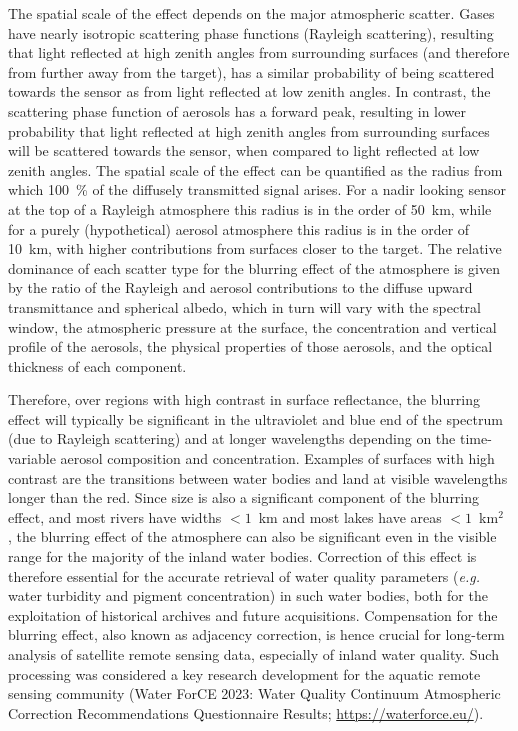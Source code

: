The spatial scale of the effect depends on the major atmospheric scatter. Gases have nearly isotropic scattering phase functions (Rayleigh scattering), resulting that light reflected at high zenith angles from surrounding surfaces (and therefore from further away from the target), has a similar probability of being scattered towards the sensor as from light reflected at low zenith angles. In contrast, the scattering phase function of aerosols has a forward peak, resulting in lower probability that light reflected at high zenith angles from surrounding surfaces will be scattered towards the sensor, when compared to light reflected at low zenith angles. The spatial scale of the effect can be quantified as the radius from which 100~\% of the diffusely transmitted signal arises. For a nadir looking sensor at the top of a Rayleigh atmosphere this radius is in the order of 50~km, while for a purely (hypothetical) aerosol atmosphere this radius is in the order of 10~km, with higher contributions from surfaces closer to the target. The relative dominance of each scatter type for the blurring effect of the atmosphere is given by the ratio of the Rayleigh and aerosol contributions to the diffuse upward transmittance and spherical albedo, which in turn will vary with the spectral window, the atmospheric pressure at the surface, the concentration and vertical profile of the aerosols, the physical properties of those aerosols, and the optical thickness of each component.

Therefore, over regions with high contrast in surface reflectance, the blurring effect will typically be significant in the ultraviolet and blue end of the spectrum (due to Rayleigh scattering) and at longer wavelengths depending on the time-variable aerosol composition and concentration. Examples of surfaces with high contrast are the transitions between water bodies and land at visible wavelengths longer than the red. Since size is also a significant component of the blurring effect, and most rivers have widths $< 1$~km \citep{Dekker2018} and most lakes have areas $< 1$~km$^2$ \citep{Verpoorter2014}, the blurring effect of the atmosphere can also be significant even in the visible range for the majority of the inland water bodies. Correction of this effect is therefore essential for the accurate retrieval of water quality parameters (\textit{e.g.} water turbidity and pigment concentration) in such water bodies, both for the exploitation of historical archives and future acquisitions. Compensation for the blurring effect, also known as adjacency correction, is hence crucial for long-term analysis of satellite remote sensing data, especially of inland water quality. Such processing was considered a key research development for the aquatic remote sensing community (Water ForCE 2023: Water Quality Continuum Atmospheric Correction Recommendations Questionnaire Results; \url{https://waterforce.eu/}).

